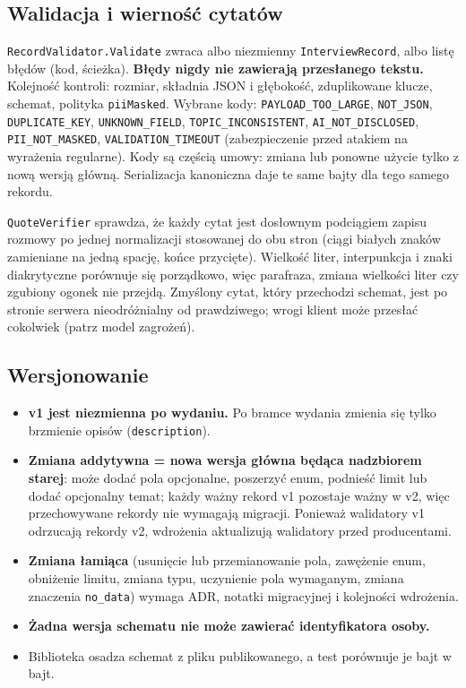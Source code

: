 \subsection{Walidacja i wierność cytatów}

\texttt{RecordValidator.Validate} zwraca albo niezmienny \texttt{InterviewRecord},
albo listę błędów (kod, ścieżka). \textbf{Błędy nigdy nie zawierają
przesłanego tekstu.} Kolejność kontroli: rozmiar, składnia JSON i głębokość,
zduplikowane klucze, schemat, polityka \texttt{piiMasked}. Wybrane kody:
\texttt{PAYLOAD\_}\allowbreak\texttt{TOO\_LARGE}, \texttt{NOT\_JSON}, \texttt{DUPLICATE\_}\allowbreak\texttt{KEY},
\texttt{UNKNOWN\_}\allowbreak\texttt{FIELD}, \texttt{TOPIC\_}\allowbreak\texttt{INCONSISTENT}, \texttt{AI\_NOT\_}\allowbreak\texttt{DISCLOSED},
\texttt{PII\_NOT\_}\allowbreak\texttt{MASKED}, \texttt{VALIDATION\_}\allowbreak\texttt{TIMEOUT} (zabezpieczenie przed
atakiem na wyrażenia regularne). Kody są częścią umowy: zmiana lub ponowne
użycie tylko z nową wersją główną. Serializacja kanoniczna daje te same bajty
dla tego samego rekordu.

\texttt{QuoteVerifier} sprawdza, że każdy cytat jest dosłownym podciągiem
zapisu rozmowy po jednej normalizacji stosowanej do obu stron (ciągi białych
znaków zamieniane na jedną spację, końce przycięte). Wielkość liter,
interpunkcja i znaki diakrytyczne porównuje się porządkowo, więc parafraza,
zmiana wielkości liter czy zgubiony ogonek nie przejdą.  Zmyślony cytat, który przechodzi schemat,
jest po stronie serwera nieodróżnialny od prawdziwego; wrogi klient może
przesłać cokolwiek (patrz model zagrożeń).

\subsection{Wersjonowanie}

\begin{itemize}[itemsep=2pt]
  \item \textbf{v1 jest niezmienna po wydaniu.} Po bramce wydania zmienia się
        tylko brzmienie opisów (\texttt{description}).
  \item \textbf{Zmiana addytywna = nowa wersja główna będąca nadzbiorem starej}:
        może dodać pola opcjonalne, poszerzyć enum, podnieść limit lub dodać
        opcjonalny temat; każdy ważny rekord v1 pozostaje ważny w v2, więc
        przechowywane rekordy nie wymagają migracji. Ponieważ walidatory v1
        odrzucają rekordy v2, wdrożenia aktualizują walidatory przed
        producentami.
  \item \textbf{Zmiana łamiąca} (usunięcie lub przemianowanie pola, zawężenie
        enum, obniżenie limitu, zmiana typu, uczynienie pola wymaganym,
        zmiana znaczenia \texttt{no\_data}) wymaga ADR, notatki migracyjnej
        i kolejności wdrożenia.
  \item \textbf{Żadna wersja schematu nie może zawierać identyfikatora osoby.}
  \item Biblioteka osadza schemat z pliku publikowanego, a test porównuje je
        bajt w bajt.
\end{itemize}

